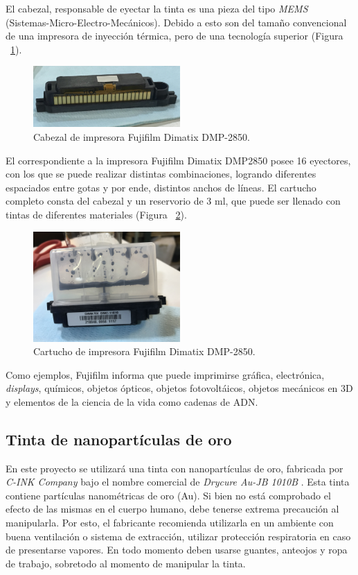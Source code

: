El cabezal, responsable de eyectar la tinta es una pieza del tipo \textit{MEMS} (Sistemas-Micro-Electro-Mecánicos). Debido a esto son del tamaño convencional de una impresora de inyección térmica, pero de una tecnología superior (Figura ~\ref{fig:Figura_cabezal}). 

\begin{figure}[H]
  \centering
    \includegraphics[width=0.5\textwidth]{Figuras/Figura_cabezal}
  \caption{Cabezal de impresora Fujifilm Dimatix DMP-2850.}
  \label{fig:Figura_cabezal}
\end{figure}

El correspondiente a la impresora Fujifilm Dimatix DMP2850 posee 16 eyectores, con los que se puede realizar distintas combinaciones, logrando diferentes espaciados entre gotas y por ende, distintos anchos de líneas. El cartucho completo consta del cabezal y un reservorio de 3 ml, que puede ser llenado con tintas de diferentes materiales (Figura ~\ref{fig:Figura_cartucho_completo}).

\begin{figure}[H]
  \centering
    \includegraphics[width=0.5\textwidth]{Figuras/Figura_cartucho_completo}
  \caption{Cartucho de impresora Fujifilm Dimatix DMP-2850.}
  \label{fig:Figura_cartucho_completo}
\end{figure}

Como ejemplos, Fujifilm informa que puede imprimirse gráfica, electrónica, \textit{displays}, químicos, objetos ópticos, objetos fotovoltáicos, objetos mecánicos en 3D y elementos de la ciencia de la vida como cadenas de ADN.

\subsection{Tinta de nanopartículas de oro}
En este proyecto se utilizará una tinta con nanopartículas de oro, fabricada por \textit{C-INK Company} bajo el nombre comercial de \textit{Drycure Au-JB 1010B} \cite{DrycureAu}. Esta tinta contiene partículas nanométricas de oro (Au). Si bien no está comprobado el efecto de las mismas en el cuerpo humano, debe tenerse extrema precaución al manipularla. Por esto, el fabricante recomienda utilizarla en un ambiente con buena ventilación o sistema de extracción, utilizar protección respiratoria en caso de presentarse vapores. En todo momento deben usarse guantes, anteojos y ropa de trabajo, sobretodo al momento de manipular la tinta.

